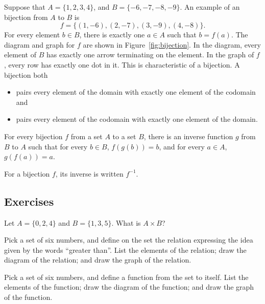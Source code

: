 \noindent Suppose that $A = \{1, 2, 3, 4\}$, and $B = \{-6, -7, -8, -9\}$.  An
example of an bijection from $A$ to $B$ is
\begin{equation*}
   f = \{(1,-6), (2,-7), (3,-9), (4,-8)\}.
\end{equation*}
For every element $b \in B$, there is exactly one $a \in A$ such that $b =
f(a)$. The diagram and graph for $f$ are shown in Figure~\ref{fig:bijection}.
In the diagram, every element of $B$ has exactly one arrow terminating on the
element.  In the graph of $f$, every row has exactly one dot in it.  This is
characteristic of a bijection.  A bijection both
\begin{itemize}
   \item pairs every element of the domain with exactly one element of the
      codomain and
   \item pairs every element of the codomain with exactly one element of the
      domain.
\end{itemize}

\begin{theorem}
   For every bijection $f$ from a set $A$ to a set $B$, there is an inverse
   function $g$ from $B$ to $A$ such that for every $b \in B$, $f(g(b)) = b$,
   and for every $a \in A$, $g(f(a)) = a$.
\label{theorem:func-inverse}
\end{theorem}

\begin{definition}
   For a bijection $f$, its inverse is written $f^{-1}$.
\end{definition}

\subsection{Exercises}

\begin{exercise}
   Let $A = \{0,2,4\}$ and $B = \{1,3,5\}$. What is $A \times B$?
\end{exercise}

\begin{exercise}
   Pick a set of six numbers, and define on the set the relation expressing the
   idea given by the words ``greater than''. List the elements of the relation;
   draw the diagram of the relation; and draw the graph of the relation.
\end{exercise}

\begin{exercise}
   Pick a set of six numbers, and define a function from the set to itself.
   List the elements of the function; draw the diagram of the function; and
   draw the graph of the function.
\end{exercise}

